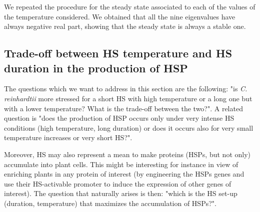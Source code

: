 \documentclass[oneside, 10pt, a4paper, twocolumn]{article}
\begin{document}
We repeated the procedure for the steady state associated to each of the values of the temperature considered.
We obtained that all the nine eigenvalues have always negative real part, showing that the steady state is always a stable one. 







\subsection{Trade-off between HS temperature and HS duration in the production of HSP}
\label{SecTradeOff}



The questions which we want to address in this section  
are the following: "is \emph{C. reinhardtii} more stressed for a short HS with high temperature or a long one but with a lower temperature? What is the trade-off between the two?". A related question is "does the production of HSP occurs only under very intense HS conditions (high temperature, long duration) or does it occurs also for very small temperature increases or very short HS?". 

Moreover, HS may also represent a mean to make proteins (HSPs, but not only) accumulate into plant cells. This might be interesting for instance in view of enriching plants in any protein of interest (by engineering the HSPs genes and use their HS-activable promoter to induce the expression of other genes of interest). 
The question that naturally arises is then: "which is the HS set-up (duration, temperature) that maximizes the accumulation of HSPs?".
\end{document}
